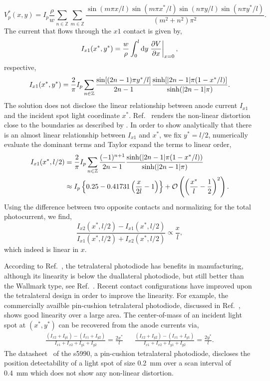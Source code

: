 \begin{equation}
	V^*_p(x,y)=I_p\frac{\rho}{w}\sum_{n\in\mathbb{Z}}\sum_{m\in\mathbb{Z}}\frac{\sin(m\pi x/l)\sin(m\pi x^*/l)\sin(n\pi y/l)\sin(n\pi y^*/l)}{(m^2+n^2)\pi^2}
	\label{eq:lucovsky_solution}.
\end{equation}
The current that flows through the $x1$ contact is given by,
\begin{equation}
	I_{x1}(x^*,y^*)=\frac{w}{\rho}\int_0^l\dd{y}\eval{\pdv{V}{x}}_{x=0},
\end{equation}
respective,
\begin{equation}
	I_{x1}(x^*,y^*)=\frac{2}{\pi}I_p\sum_{n\in\mathbb{Z}}\frac{\sin[(2n-1)\pi y^*/l]}{2n-1}\frac{\sinh[\abs{2n-1}\pi(1-x^*/l)]}{\sinh(\abs{2n-1}\pi)}
	\label{eq:lucovsky_current}.
\end{equation}
The solution does not disclose the linear relationship between anode current $I_{x1}$ and the incident spot light coordinate $x^*$.
Ref.~\cite[Fig.~7]{Woltring75} renders the non-linear distortion close to the boundaries as described by .
In order to show analytically that there is an almost linear relationship between $I_{x1}$ and $x^*$, we fix $y^*=l/2$, numerically evaluate the dominant terms and Taylor expand the terms to linear order,
\begin{align}
	I_{x1}(x^*,l/2)
	&=\frac{2}{\pi}I_p\sum_{n\in\mathbb{Z}}\frac{(-1)^{n+1}}{2n-1}\frac{\sinh(\abs{2n-1}\pi(1-x^*/l))}{\sinh(\abs{2n-1}\pi)}\\
	&\approx I_p\left\{0.25-0.41731\left(\frac{x}{2l}-1\right)\right\}+\mathcal{O}\left(\left(\frac{x^*}{l}-\frac{1}{2}\right)^2\right).
\end{align}
Using the difference between two opposite contacts and normalizing for the total photocurrent, we find,
\begin{equation}
	\frac{I_{x2}(x^*,l/2)-I_{x1}(x^*,l/2)}{I_{x1}(x^*,l/2)+I_{x2}(x^*,l/2)}
	\propto\frac{x}{l},
\end{equation}
which indeed is linear in $x$.

According to Ref.~\cite[p.~41]{Noorlag74}, the tetralateral photodiode has benefits in manufacturing, although its linearity is below the duallateral photodiode, but still better than the Wallmark type, see Ref.~\cite{Woltring75}.
Recent contact configurations have improved upon the tetralateral design in order to improve the linearity.
For example, the commercially availble pin-cushion tetralateral photodiode, discussed in Ref.~\cite{Doke87,Wang89}, shows good linearity over a large area.
The center-of-mass of an incident light spot at $(x^*,y^*)$ can be recovered from the anode currents via,
\begin{align}
	\frac{\left(I_{x2}+I_{y1}\right)-\left(I_{x1}+I_{y2}\right)}{I_{x1}+I_{x2}+I_{y1}+I_{y2}}=\frac{2x^*}{l} &&
	\frac{\left(I_{x2}+I_{y2}\right)-\left(I_{x1}+I_{y1}\right)}{I_{x1}+I_{x2}+I_{y1}+I_{y2}}=\frac{2y^*}{l}	.
\end{align}
The datasheet~\cite{HamamatsuS5990} of the \gls{s5990}, a pin-cushion tetralateral photodiode, discloses the position detectability of a light spot of size \SI{0.2}{\milli\meter} over a scan interval of \SI{0.4}{\milli\meter} which does not show any non-linear distortion.

